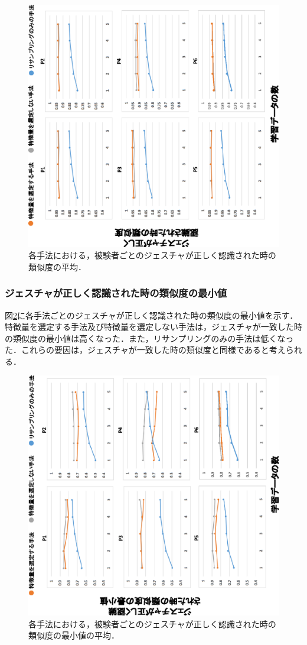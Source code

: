 \begin{figure}[!h]
\centering
\includegraphics[width=0.85\columnwidth,angle=-90]{img/pre_sim.eps}
\caption{各手法における，被験者ごとのジェスチャが正しく認識された時の類似度の平均．}
\label{fig:rare_sim}
\end{figure}

\newpage
\subsubsection{ジェスチャが正しく認識された時の類似度の最小値}
図\ref{fig:rare_min}に各手法ごとのジェスチャが正しく認識された時の類似度の最小値を示す．
特徴量を選定する手法及び特徴量を選定しない手法は，ジェスチャが一致した時の類似度の最小値は高くなった．また，リサンプリングのみの手法は低くなった．これらの要因は，ジェスチャが一致した時の類似度と同様であると考えられる．

\begin{figure}[!h]
\centering
\includegraphics[width=0.85\columnwidth,angle=-90]{img/pre_min.eps}
\caption{各手法における，被験者ごとのジェスチャが正しく認識された時の類似度の最小値の平均．}
\label{fig:rare_min}
\end{figure}

